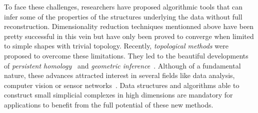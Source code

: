 To face these challenges, researchers have proposed algorithmic tools that can infer some of the properties of the structures underlying the data without full reconstruction. Dimensionality reduction techniques mentionned above have been pretty successful in this vein %
but have only been proved to converge when limited to simple shapes with trivial topology.  Recently, {\em topological methods} were proposed to overcome these limitations. They led to the beautiful developments of {\em persistent homology}~\cite{eh-ph-2008} and {\em geometric inference}~\cite{geometrica-ccl09}. Although of a fundamental nature, these advances attracted interest in several fields like data analysis, computer vision or sensor networks~\cite{rg-bptd-2008}. Data structures and algorithms able to construct small simplicial complexes in high dimensions are mandatory for applications to benefit from the full potential of these new methods.



